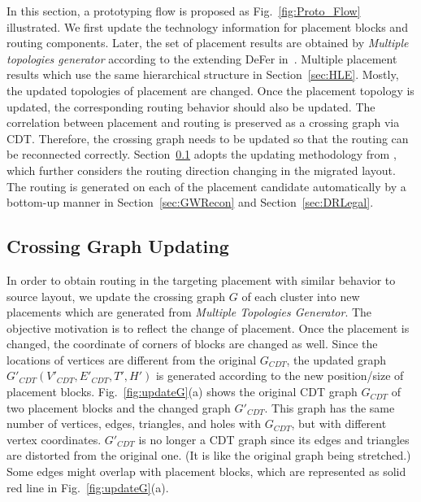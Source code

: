     In this section, a prototyping flow is proposed as Fig.~\ref{fig:Proto_Flow} illustrated. We first update the technology information for placement blocks and routing components. Later, the set of placement results are obtained by \textit{Multiple topologies generator} according to the extending DeFer in~\cite{ALP_YPWeng_iccad2011}. Multiple placement results which use the same hierarchical structure in Section~\ref{sec:HLE}. Mostly, the updated topologies of placement are changed. Once the placement topology is updated, the corresponding routing behavior should also be updated. The correlation between placement and routing is preserved as a crossing graph via CDT. Therefore, the crossing graph needs to be updated so that the routing can be reconnected correctly. Section~\ref{sec:updateG} adopts the updating methodology from \cite{Chin_DMR_ICCAD2013}, which further considers the routing direction changing in the migrated layout. The routing is generated on each of the placement candidate automatically by a bottom-up manner in Section~\ref{sec:GWRecon} and Section~\ref{sec:DRLegal}. 

    \subsection{Crossing Graph Updating}\label{sec:updateG}


      In order to obtain routing in the targeting placement with similar behavior to source layout, we update the crossing graph $G$ of each cluster into new placements which are generated from {\it Multiple Topologies Generator}. The objective motivation is to reflect the change of placement. Once the placement is changed, the coordinate of corners of blocks are changed as well. Since the locations of vertices are different from the original $G_{CDT}$, the updated graph $G'_{CDT}(V'_{CDT},E'_{CDT},T',H')$ is generated according to the new position/size of placement blocks. Fig.~\ref{fig:updateG}(a) shows the original CDT graph $G_{CDT}$ of two placement blocks and the changed graph $G'_{CDT}$. This graph has the same number of vertices, edges, triangles, and holes with $G_{CDT}$, but with different vertex coordinates. $G'_{CDT}$ is no longer a CDT graph since its edges and triangles are distorted from the original one. (It is like the original graph being stretched.) Some edges might overlap with placement blocks, which are represented as solid red line in Fig.~\ref{fig:updateG}(a).


